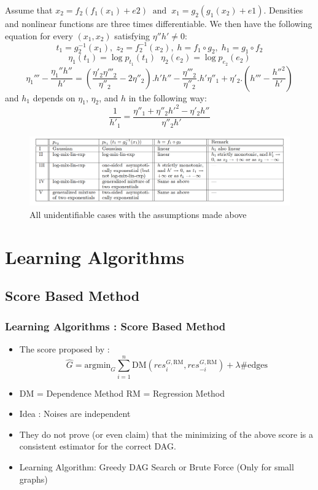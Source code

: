 \documentclass{beamer}
\begin{document}
\begin{frame}
\begin{theorem}
\begin{small}
Assume that $x_2 = f_2(f_1(x_1) + e2) \;\;\mathrm{and} \;\;x_1 = g_2(g_1(x_2) + e1)$.
 Densities and nonlinear functions are three times differentiable. We then have the following equation for every $(x_1, x_2)$ satisfying $\eta''h'\neq 0$:
 $$t_1 = g_2^{-1}(x_1),\; z_2 = f_2^{-1}(x_2),\; h = f_1\circ g_2,\; h_1 = g_1 \circ f_2$$
 $$\eta_1(t_1) = \log p_{t_1}(t_1) \;\; \eta_2(e_2) = \log p_{e_2}(e_2)$$
 $$\eta_1''' - \frac{\eta_1'' h''}{h'} = (\frac{\eta'_2 \eta'''_2}{\eta''_2} - 2 \eta''_2).h' h'' - \frac{\eta'''_2}{\eta''_2}.h'\eta''_1 + \eta'_2.(h'''-\frac{h''^2}{h'})$$
 and  $h_1$ depends on $\eta_1$, $\eta_2$, and $h$ in the following way:
 $$\frac{1}{h'_1} = \frac{\eta''_1 + \eta''_2h'^2-\eta'_2h''}{\eta''_2h'}$$
\end{small}
\end{theorem}
\end{frame}
\begin{frame}
\begin{figure}
	\centering
	\includegraphics[scale=0.2]{PNL.png}
	\caption{All unidentifiable cases with the assumptions made above}
\end{figure}
\end{frame}

\section{Learning Algorithms}
\subsection{Score Based Method}
\begin{frame}
\frametitle{Learning Algorithms : Score Based Method}
\begin{itemize}
\item The score proposed by \cite{continous}:
$$\hat{G} = \mathrm{argmin}_G \sum_{i=1}^n \mathrm{DM}(res_i^{G, \mathrm{RM}}, res_{-i}^{G, \mathrm{RM}}) + \lambda \#\mathrm{edges}$$
\item DM = Dependence Method \hspace{1cm} RM = Regression Method
\item Idea : Noises are independent
\item They do not prove (or even claim) that the minimizing of the above score is a consistent estimator for the correct DAG.
\item Learning Algorithm: Greedy DAG Search or Brute Force (Only for small graphs)
\end{itemize}
\end{frame}
\end{document}
